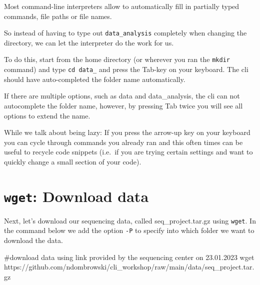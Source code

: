 \documentclass[
  letterpaper,
  DIV=11,
  numbers=noendperiod]{scrreprt}
\newenvironment{Shaded}{}{}
\newcommand{\CommentTok}[1]{\textcolor[rgb]{0.42,0.45,0.49}{#1}}
\newcommand{\FunctionTok}[1]{\textcolor[rgb]{0.44,0.26,0.76}{#1}}
\newcommand{\NormalTok}[1]{\textcolor[rgb]{0.14,0.16,0.18}{#1}}
\begin{document}
\begin{tcolorbox}[enhanced jigsaw, title=\textcolor{quarto-callout-tip-color}{\faLightbulb}\hspace{0.5em}{Tip: Command-line completion}, colframe=quarto-callout-tip-color-frame, opacitybacktitle=0.6, rightrule=.15mm, arc=.35mm, left=2mm, colbacktitle=quarto-callout-tip-color!10!white, bottomrule=.15mm, leftrule=.75mm, toprule=.15mm, opacityback=0, bottomtitle=1mm, colback=white, toptitle=1mm, breakable, titlerule=0mm, coltitle=black]

Most command-line interpreters allow to automatically fill in partially
typed commands, file paths or file names.

So instead of having to type out \texttt{data\_analysis} completely when
changing the directory, we can let the interpreter do the work for us.

To do this, start from the home directory (or wherever you ran the
\texttt{mkdir} command) and type \texttt{cd\ data\_} and press the
Tab-key on your keyboard. The cli should have auto-completed the folder
name automatically.

If there are multiple options, such as data and data\_analysis, the cli
can not autocomplete the folder name, however, by pressing Tab twice you
will see all options to extend the name.

While we talk about being lazy: If you press the arrow-up key on your
keyboard you can cycle through commands you already ran and this often
times can be useful to recycle code snippets (i.e.~if you are trying
certain settings and want to quickly change a small section of your
code).

\end{tcolorbox}

\section{\texorpdfstring{\texttt{wget}: Download
data}{wget: Download data}}\label{wget-download-data}

Next, let's download our sequencing data, called seq\_project.tar.gz
using \texttt{wget}. In the command below we add the option \texttt{-P}
to specify into which folder we want to download the data.

\begin{Shaded}
\begin{Highlighting}[]
\CommentTok{\#download data using link provided by the sequencing center on 23.01.2023}
\FunctionTok{wget}\NormalTok{ https://github.com/ndombrowski/cli\_workshop/raw/main/data/seq\_project.tar.gz}
\end{Highlighting}
\end{Shaded}
\end{document}
